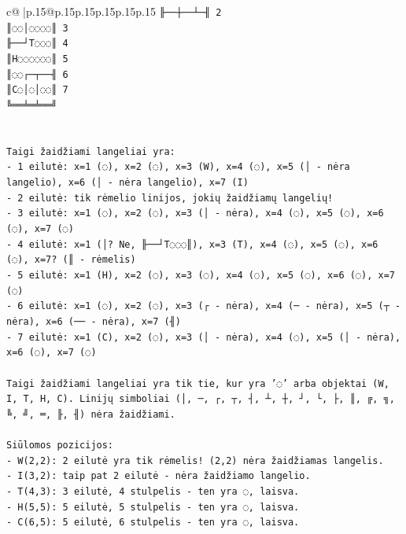 \documentclass{article}
\begin{document}
{\begin{supertabular}{c@{$\;$}|p{.15\linewidth}@{}p{.15\linewidth}p{.15\linewidth}p{.15\linewidth}p{.15\linewidth}p{.15\linewidth}}
{{{\texttt{╟──┼──┴─╢ 2} \\
\texttt{║◌◌│◌◌◌◌║ 3} \\
\texttt{╟──┘T◌◌◌║ 4} \\
\texttt{║H◌◌◌◌◌◌║ 5} \\
\texttt{║◌◌┌─┬──╢ 6} \\
\texttt{║C◌│◌│◌◌║ 7} \\
\texttt{╚══╧═╧══╝} \\
\\ 
\\ 
\texttt{Taigi žaidžiami langeliai yra:} \\
\texttt{{-} 1 eilutė: x=1 (◌), x=2 (◌), x=3 (W), x=4 (◌), x=5 (│ {-} nėra langelio), x=6 (│ {-} nėra langelio), x=7 (I)} \\
\texttt{{-} 2 eilutė: tik rėmelio linijos, jokių žaidžiamų langelių!} \\
\texttt{{-} 3 eilutė: x=1 (◌), x=2 (◌), x=3 (│ {-} nėra), x=4 (◌), x=5 (◌), x=6 (◌), x=7 (◌)} \\
\texttt{{-} 4 eilutė: x=1 (│? Ne, ╟──┘T◌◌◌║), x=3 (T), x=4 (◌), x=5 (◌), x=6 (◌), x=7? (║ {-} rėmelis)} \\
\texttt{{-} 5 eilutė: x=1 (H), x=2 (◌), x=3 (◌), x=4 (◌), x=5 (◌), x=6 (◌), x=7 (◌)} \\
\texttt{{-} 6 eilutė: x=1 (◌), x=2 (◌), x=3 (┌ {-} nėra), x=4 (─ {-} nėra), x=5 (┬ {-} nėra), x=6 (── {-} nėra), x=7 (╢)} \\
\texttt{{-} 7 eilutė: x=1 (C), x=2 (◌), x=3 (│ {-} nėra), x=4 (◌), x=5 (│ {-} nėra), x=6 (◌), x=7 (◌)} \\
\\ 
\texttt{Taigi žaidžiami langeliai yra tik tie, kur yra '◌' arba objektai (W, I, T, H, C). Linijų simboliai (│, ─, ┌, ┬, ┤, ┴, ┼, ┘, └, ├, ║, ╔, ╗, ╚, ╝, ═, ╟, ╢) nėra žaidžiami.} \\
\\ 
\texttt{Siūlomos pozicijos:} \\
\texttt{{-} W(2,2): 2 eilutė yra tik rėmelis! (2,2) nėra žaidžiamas langelis.} \\
\texttt{{-} I(3,2): taip pat 2 eilutė {-} nėra žaidžiamo langelio.} \\
\texttt{{-} T(4,3): 3 eilutė, 4 stulpelis {-} ten yra ◌, laisva.} \\
\texttt{{-} H(5,5): 5 eilutė, 5 stulpelis {-} ten yra ◌, laisva.} \\
\texttt{{-} C(6,5): 5 eilutė, 6 stulpelis {-} ten yra ◌, laisva.} \\
\\ 
}}}
\end{supertabular}}
\end{document}
